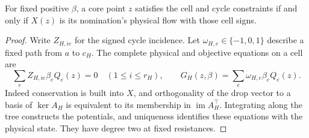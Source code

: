 \begin{lemma}
\label{lem:a-blk-affine}
For fixed positive $\beta$, a core point $z$ satisfies the cell and cycle
constraints if and only if $X(z)$ is its nomination's physical flow
with those cell signs.
\end{lemma}
\begin{proof}
Write $Z_{H,ie}$ for the signed cycle incidence.
Let $\omega_{H,e}\in\{-1,0,1\}$ describe a fixed path from $a$ to $c_H$. The complete
physical and objective equations on a cell are
\begin{equation}
 \sum_e Z_{H,ie}\beta_e Q_e(z)=0\quad(1\le i\le r_H),
 \qquad G_H(z,\beta)=\sum_e\omega_{H,e}\beta_e Q_e(z).
 \label{eq:a-blk-polynomials}
\end{equation}
Indeed conservation is built into $X$, and orthogonality of the drop
vector to a basis of $\ker A_H$ is equivalent to its membership in
$\operatorname{im}A_H^\top$. Integrating along the tree constructs the
potentials, and uniqueness identifies these equations with the
physical state. They have degree two at fixed resistances.
\end{proof}

